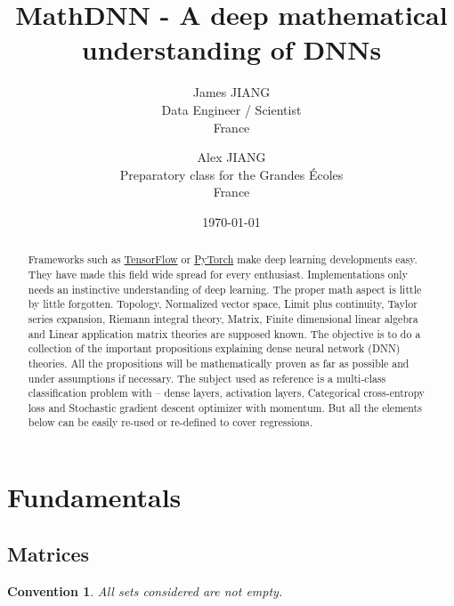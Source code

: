 \documentclass[11pt,en]{elegantpaper}
\title{MathDNN - A deep mathematical understanding of DNNs}
\author{James JIANG \\ Data Engineer / Scientist \\ France \and Alex JIANG \\ Preparatory class for the Grandes Écoles \\ France}
\institute{\href{https://github.com/iLoveDataJjia}{iLoveDataJjia Github}}
\date{\today}
\newtheorem{convention}{Convention}
\begin{document}
\maketitle

\begin{abstract}
  Frameworks such as \href{https://www.tensorflow.org/?hl=en}{TensorFlow} or \href{https://pytorch.org/}{PyTorch} make deep learning developments
  easy. They have made this field wide spread for every enthusiast. Implementations only needs an instinctive understanding of deep learning.
  The proper math aspect is little by little forgotten. Topology, Normalized vector space, Limit plus continuity, Taylor series expansion,
  Riemann integral theory, Matrix, Finite dimensional linear algebra and Linear application matrix theories are supposed known. The objective
  is to do a collection of the important propositions explaining dense neural network (DNN) theories. All the propositions will be
  mathematically proven as far as possible and under assumptions if necessary. The subject used as reference is a multi-class classification
  problem with – dense layers, activation layers, Categorical cross-entropy loss and Stochastic gradient descent optimizer with momentum.
  But all the elements below can be easily re-used or re-defined to cover regressions.
\end{abstract}

\section{Fundamentals}

\subsection{Matrices}

\begin{convention}
  All sets considered are not empty.
\end{convention}
\end{document}
